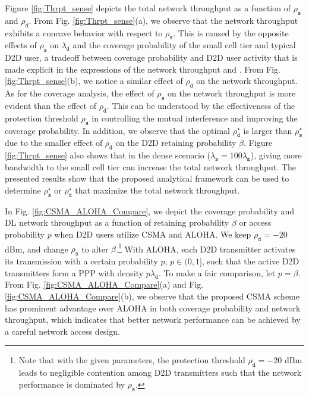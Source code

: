 \documentclass[twocolumn,english]{IEEEtran}
\theoremstyle{plain}
\theoremstyle{definition}
\begin{document}
Figure \ref{fig:Thrpt_sense} depicts the total network throughput
as a function of $\rho_{\mathtt{s}}$ and $\rho_{\mathtt{d}}$. From
Fig. \ref{fig:Thrpt_sense}(a), we observe that the network throughput
exhibits a concave behavior with respect to $\rho_{\mathtt{s}}$.
This is caused by the opposite effects of $\rho_{\mathtt{s}}$ on
$\lambda_{\mathtt{d}}$ and the coverage probability of the small
cell tier and typical D2D user, a tradeoff between coverage probability
and D2D user activity that is made explicit in the expressions of
the network throughput  and .
From Fig. \ref{fig:Thrpt_sense}(b), we notice a similar effect of
$\rho_{\mathtt{d}}$ on the network throughput. As for the coverage
analysis, the effect of $\rho_{\mathtt{s}}$ on the network throughput
is more evident than the effect of $\rho_{\mathtt{d}}$. This can
be understood by the effectiveness of the protection threshold $\rho_{\mathtt{s}}$
in controlling the mutual interference and improving the coverage
probability. In addition, we observe that the optimal $\rho_{\mathtt{d}}^{\star}$
is larger than $\rho_{\mathtt{s}}^{\star}$ due to the smaller effect
of $\rho_{\mathtt{d}}$ on the D2D retaining probability $\beta$.
Figure \ref{fig:Thrpt_sense} also shows that in the dense scenario
($\lambda_{\mathtt{s}}=100\lambda_{\mathtt{m}}$), giving more bandwidth
to the small cell tier can increase the total network throughput.
The presented results show that the proposed analytical framework
can be used to determine $\rho_{\mathtt{s}}^{\star}$ or $\rho_{\mathtt{d}}^{\star}$
that maximize the total network throughput.

In Fig. \ref{fig:CSMA_ALOHA_Compare}, we depict the coverage probability
and DL network throughput as a function of retaining probability $\beta$
or access probability $p$ when D2D users utilize CSMA and ALOHA.
We keep $\rho_{\mathtt{d}}=-20$ dBm, and change $\rho_{\mathtt{s}}$
to alter $\beta$.\footnote{Note that with the given parameters, the protection threshold $\rho_{\mathtt{d}}=-20$
dBm leads to negligible contention among D2D transmitters such that
the network performance is dominated by $\rho_{\mathtt{s}}$.} With ALOHA, each D2D transmitter activates its transmission with
a certain probability $p$, $p\in(0,1]$, such that the active D2D
transmitters form a PPP with density $p\lambda_{\mathtt{d}}$. To
make a fair comparison, let $p=\beta$. From Fig. \ref{fig:CSMA_ALOHA_Compare}(a)
and Fig. \ref{fig:CSMA_ALOHA_Compare}(b), we observe that the proposed
CSMA scheme has prominent advantage over ALOHA in both coverage probability
and network throughput, which indicates that better network performance
can be achieved by a careful network access design.
\end{document}
